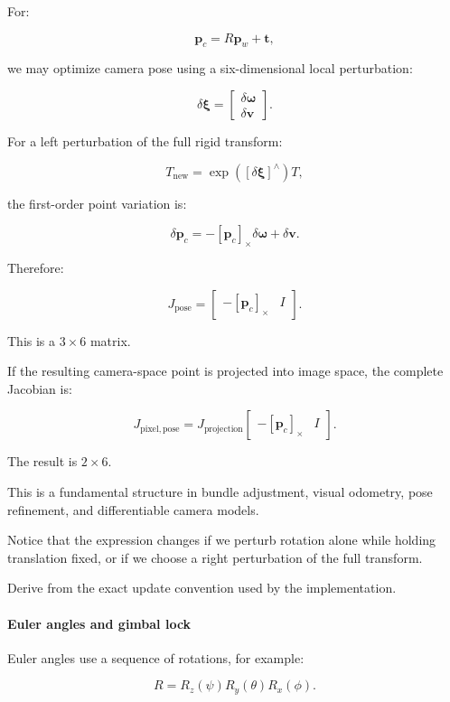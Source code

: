 For:

\[
\mathbf p_c=R\mathbf p_w+\mathbf t,
\]

we may optimize camera pose using a six-dimensional local perturbation:

\[
\delta\boldsymbol\xi= \begin{bmatrix} \delta\boldsymbol\omega\\ \delta\mathbf v \end{bmatrix}.
\]

For a left perturbation of the full rigid transform:

\[
T_{\mathrm{new}}= \exp([\delta\boldsymbol\xi]^\wedge)T,
\]

the first-order point variation is:

\[
\delta\mathbf p_c = -[\mathbf p_c]_\times\delta\boldsymbol\omega +\delta\mathbf v.
\]

Therefore:

\[
\boxed{ J_{\mathrm{pose}} = \begin{bmatrix} -[\mathbf p_c]_\times&I \end{bmatrix} }.
\]

This is a \(3\times6\) matrix.

If the resulting camera-space point is projected into image space, the complete Jacobian is:

\[
\boxed{ J_{\mathrm{pixel,pose}} = J_{\mathrm{projection}} \begin{bmatrix} -[\mathbf p_c]_\times&I \end{bmatrix} }.
\]

The result is \(2\times6\).

This is a fundamental structure in bundle adjustment, visual odometry, pose refinement, and differentiable camera models.

Notice that the expression changes if we perturb rotation alone while holding translation fixed, or if we choose a right perturbation of the full transform.

Derive from the exact update convention used by the implementation.

\paragraph{Euler angles and gimbal lock}\label{02-foundations-ii-ch027-euler-angles-and-gimbal-lock}

Euler angles use a sequence of rotations, for example:

\[
R=R_z(\psi)R_y(\theta)R_x(\phi).
\]

